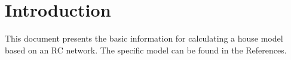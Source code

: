\section{Introduction}

This document presents the basic information for calculating a house model
based on an RC network. The specific model can be found in the References.